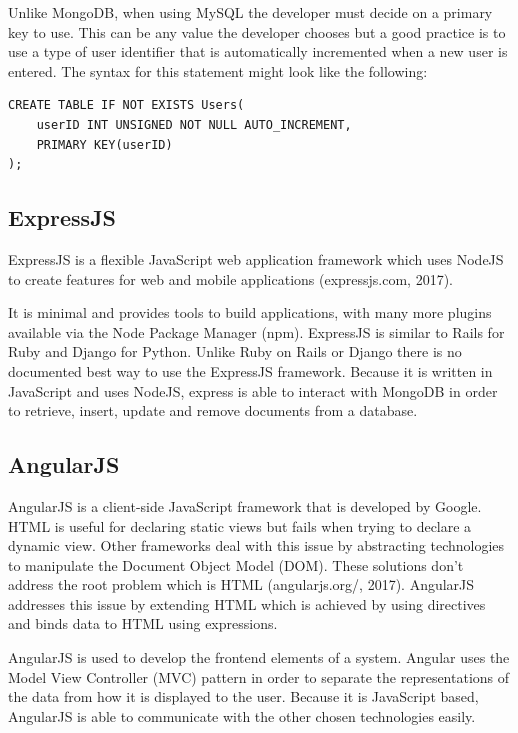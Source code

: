 \documentclass[12pt]{article}
\begin{document}
Unlike MongoDB, when using MySQL the developer must decide on a primary key to use. This can be any value the developer chooses but a good practice is to use a type of user identifier that is automatically incremented when a new user is entered. The syntax for this statement might look like the following: 

\begin{verbatim}
CREATE TABLE IF NOT EXISTS Users(
	userID INT UNSIGNED NOT NULL AUTO_INCREMENT,
	PRIMARY KEY(userID)
);
\end{verbatim}   

\begin{center}
\subsection{ExpressJS}
\end{center}
ExpressJS is a flexible JavaScript web application framework which uses NodeJS to create features for web and mobile applications (expressjs.com, 2017).

It is minimal and provides tools to build applications, with many more plugins available via the Node Package Manager (npm). ExpressJS is similar to Rails for Ruby and Django for Python. Unlike Ruby on Rails or Django there is no documented best way to use the ExpressJS framework. Because it is written in JavaScript and uses NodeJS, express is able to interact with MongoDB in order to retrieve, insert, update and remove documents from a database.

{\centering \subsection{AngularJS}}
AngularJS is a client-side JavaScript framework that is developed by Google. HTML is useful for declaring static views but fails when trying to declare a dynamic view. Other frameworks deal with this issue by abstracting technologies to manipulate the Document Object Model (DOM). These solutions don’t address the root problem which is HTML (angularjs.org/, 2017). AngularJS addresses this issue by extending HTML which is achieved by using directives and binds data to HTML using expressions.

AngularJS is used to develop the frontend elements of a system. Angular uses the Model View Controller (MVC) pattern in order to separate the representations of the data from how it is displayed to the user. Because it is JavaScript based, AngularJS is able to communicate with the other chosen technologies easily.
\end{document}
